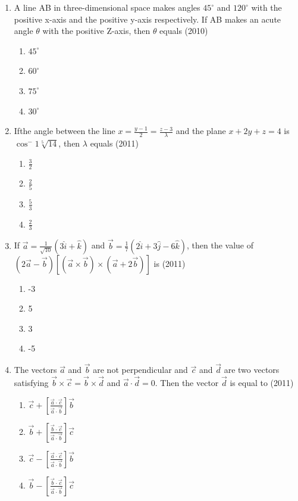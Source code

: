 \documentclass[12pt]{article}
\providecommand{\brak}[1]{\ensuremath{\left(#1\right)}}
\providecommand{\sbrak}[1]{\ensuremath{{}\left[#1\right]}}
\begin{document}
\begin{enumerate}
\item A line AB in three-dimensional space makes angles $45^\circ$ and $120^\circ$ with the positive x-axis and the positive y-axis respectively. If AB makes an acute angle $\theta$ with the positive Z-axis, then $\theta$ equals (2010)
\begin{enumerate}
\item $45^\circ$
\item $60^\circ$
\item $75^\circ$
\item $30^\circ$
\end{enumerate}
\item Ifthe angle between the line  $x=\frac{y-1}{2}=\frac{z-3}{\lambda}$ and the plane 
$x+2y+z=4$ is $\cos^-1\sqrt[5]{14}$, then $\lambda$ equals (2011)
\begin{enumerate}
\item $\frac{3}{2}$
\item $\frac{2}{5}$
\item $\frac{5}{3}$
\item $\frac{2}{3}$
\end{enumerate}
\item If $\vec{a}=\frac{1}{\sqrt{10}}\brak{3\hat{i}+\hat{k}}$ and $\vec{b}=\frac{1}{7}\brak{2\hat{i}+3\hat{j}-6\hat{k}}$, then the value of $\brak{2\vec{a}-\vec{b}}\sbrak{\brak{\vec{a}\times\vec{b}}\times\brak{\vec{a}+2\vec{b}}}$ is (2011)
\begin{enumerate}
\item  -3
\item 5
\item 3 
\item -5
\end{enumerate}
\item The vectors $\vec{a}$ and $\vec{b}$ are not perpendicular and  $\vec{c}$  and $\vec{d}$ are two vectors satisfying $\vec{b}\times\vec{c}=\vec{b}\times\vec{d}$ and $\vec{a}\cdot\vec{d}=0$. Then the vector $\vec{d}$ is equal to (2011)
\begin{enumerate}
\item $\vec{c}+\sbrak{\frac{\vec{a}\cdot\vec{c}}{\vec{a}\cdot\vec{b}}}\vec{b}$ 
\item $\vec{b}+\sbrak{\frac{\vec{b}\cdot\vec{c}}{\vec{a}\cdot\vec{b}}}\vec{c}$
\item $\vec{c}-\sbrak{\frac{\vec{a}\cdot\vec{c}}{\vec{a}\cdot\vec{b}}}\vec{b}$
\item $\vec{b}-\sbrak{\frac{\vec{b}\cdot\vec{c}}{\vec{a}\cdot\vec{b}}}\vec{c}$
\end{enumerate}

\end{enumerate}
\end{document}
